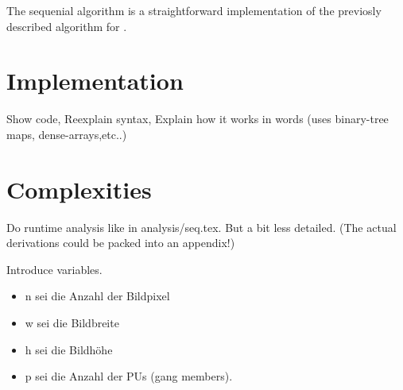 


  The sequenial algorithm is a straightforward implementation of the previosly
  described algorithm for \algo.
  
  \section{Implementation}
    Show code,
    Reexplain syntax,
    Explain how it works in words (uses binary-tree maps, dense-arrays,etc..)
    
  \section{Complexities}
    Do runtime analysis like in analysis/seq.tex. But a bit less detailed.
    (The actual derivations could be packed into an appendix!)
    
    
    Introduce variables.
    \begin{itemize}
      \item n sei die Anzahl der Bildpixel
      \item w sei die Bildbreite
      \item h sei die Bildhöhe
      \item p sei die Anzahl der PUs (gang members).
    \end{itemize}
